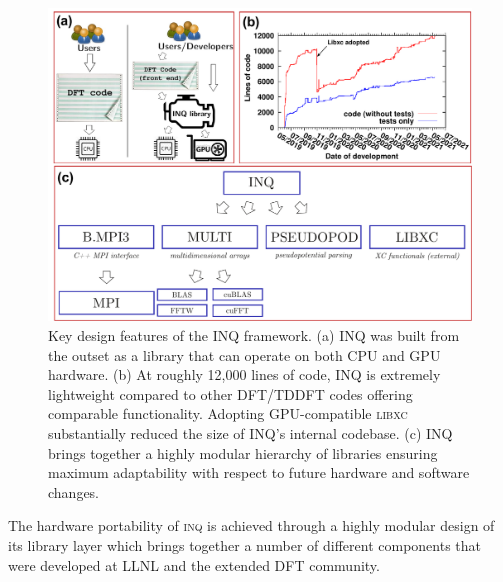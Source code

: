 \begin{figure}[h]
	\centering
	\includegraphics[width=0.8\linewidth]{figures/INQ_design_features.pdf}
	\caption{%
		Key design features of the INQ framework.
		(a) INQ was built from the outset as a library that can operate on both CPU and GPU hardware.
		(b) At roughly 12,000 lines of code, INQ is extremely lightweight compared to other DFT/TDDFT codes offering comparable functionality.
		Adopting GPU-compatible \textsc{libxc} substantially reduced the size of INQ's internal codebase.
		(c) INQ brings together a highly modular hierarchy of libraries ensuring maximum adaptability with respect to future hardware and software changes.
	}
	\label{fig:inq_design}
\end{figure}

The hardware portability of \textsc{inq} is achieved through a highly modular design of its library layer which brings together a number of different components that were developed at LLNL and the extended DFT community. 

